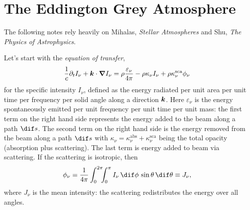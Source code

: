 \chapter[Eddington Grey Atmosphere]{The Eddington Grey Atmosphere}

The following notes rely heavily on Mihalas, \emph{Stellar Atmospheres} and Shu, \emph{The Physics of Astrophysics}.

Let's start with the \emph{equation of transfer},
\begin{equation}\label{e.transfer}
\frac{1}{c}\partial_{t}I_{\nu} + \boldsymbol{k}\cdot\boldsymbol{\nabla} I_{\nu} = \rho \frac{\varepsilon_{\nu}}{4\pi} - \rho\kappa_{\nu} I_{\nu} + \rho\kappa_{\nu}^{\mathrm{sca}}\phi_{\nu}
\end{equation}
for the specific intensity $I_{\nu}$, defined as the energy radiated per unit area per unit time per frequency per solid angle along a direction $\boldsymbol{k}$. Here $\varepsilon_{\nu}$ is the energy spontaneously emitted per unit frequency per unit time per unit mass: the first term on the right hand side represents the energy added to the beam along a path $\dif s$.  The second term on the right hand side is the energy removed from the beam along a path $\dif s$ with $\kappa_{\nu} = \kappa_{\nu}^{\mathrm{abs}} + \kappa_{\nu}^{\mathrm{sca}}$ being the total opacity (absorption plus scattering). The last term is energy added to beam via scattering.  If the scattering is isotropic, then
\begin{equation}\label{e.isosca}
\phi_{\nu} = \frac{1}{4\pi}\int_{0}^{2\pi}\!\!\!\int_{0}^{\pi} I_{\nu}\,\dif\phi\,\sin\theta\,\dif\theta \equiv J_{\nu},
\end{equation}
where $J_{\nu}$ is the mean intensity: the scattering redistributes the energy over all angles.

